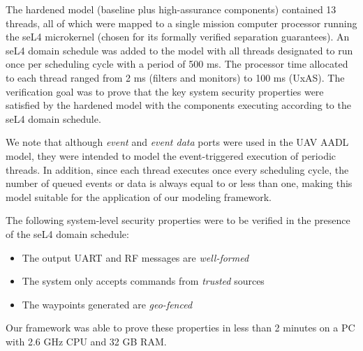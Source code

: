 The hardened model (baseline plus high-assurance components) contained 13 threads,
all of which were mapped to a single mission computer processor running the seL4 microkernel (chosen for its formally verified separation guarantees).
An seL4 domain schedule was added to the model with all threads designated to run once per scheduling cycle with a period of 500 ms.
The processor time allocated to each thread ranged from 2 ms (filters and monitors) to 100 ms (UxAS).
The verification goal was to prove that the key system security properties were satisfied by the hardened model with the components executing according to the seL4 domain schedule.

We note that although \textit{event} and \textit{event data} ports were used in the UAV AADL model, they were intended to model the event-triggered execution of periodic threads.
In addition, since each thread executes once every scheduling cycle, the number of queued events or data is always equal to or less than one,
making this model suitable for the application of our modeling framework.

The following system-level security properties were to be verified in the presence of the seL4 domain schedule:
\begin{itemize}
	\item The output UART and RF messages are \emph{well-formed}
	\item The system only accepts commands from \emph{trusted} sources
	\item The waypoints generated are \emph{geo-fenced}
\end{itemize}
Our framework was able to prove these properties in less than 2 minutes on a PC with 2.6 GHz CPU and 32 GB RAM.


